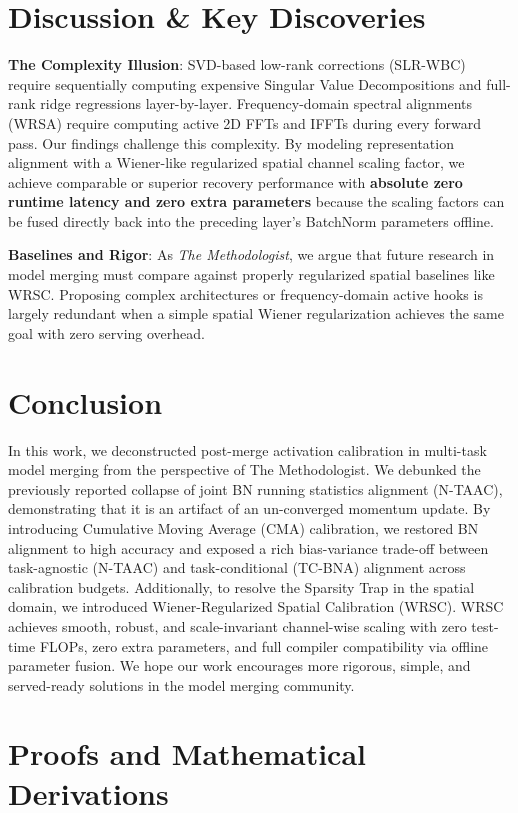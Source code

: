 \documentclass{article}
\theoremstyle{plain}
\theoremstyle{definition}
\theoremstyle{remark}
\begin{document}
\section{Discussion \& Key Discoveries}
\label{sec:discussion}
\textbf{The Complexity Illusion}: SVD-based low-rank corrections (SLR-WBC) require sequentially computing expensive Singular Value Decompositions and full-rank ridge regressions layer-by-layer. Frequency-domain spectral alignments (WRSA) require computing active 2D FFTs and IFFTs during every forward pass. Our findings challenge this complexity. By modeling representation alignment with a Wiener-like regularized spatial channel scaling factor, we achieve comparable or superior recovery performance with \textbf{absolute zero runtime latency and zero extra parameters} because the scaling factors can be fused directly back into the preceding layer's BatchNorm parameters offline.

\textbf{Baselines and Rigor}: As \textit{The Methodologist}, we argue that future research in model merging must compare against properly regularized spatial baselines like WRSC. Proposing complex architectures or frequency-domain active hooks is largely redundant when a simple spatial Wiener regularization achieves the same goal with zero serving overhead.

\section{Conclusion}
\label{sec:conclusion}
In this work, we deconstructed post-merge activation calibration in multi-task model merging from the perspective of The Methodologist. We debunked the previously reported collapse of joint BN running statistics alignment (N-TAAC), demonstrating that it is an artifact of an un-converged momentum update. By introducing Cumulative Moving Average (CMA) calibration, we restored BN alignment to high accuracy and exposed a rich bias-variance trade-off between task-agnostic (N-TAAC) and task-conditional (TC-BNA) alignment across calibration budgets. Additionally, to resolve the Sparsity Trap in the spatial domain, we introduced Wiener-Regularized Spatial Calibration (WRSC). WRSC achieves smooth, robust, and scale-invariant channel-wise scaling with zero test-time FLOPs, zero extra parameters, and full compiler compatibility via offline parameter fusion. We hope our work encourages more rigorous, simple, and served-ready solutions in the model merging community.

\clearpage
\appendix
\onecolumn
\section{Proofs and Mathematical Derivations}
\end{document}

